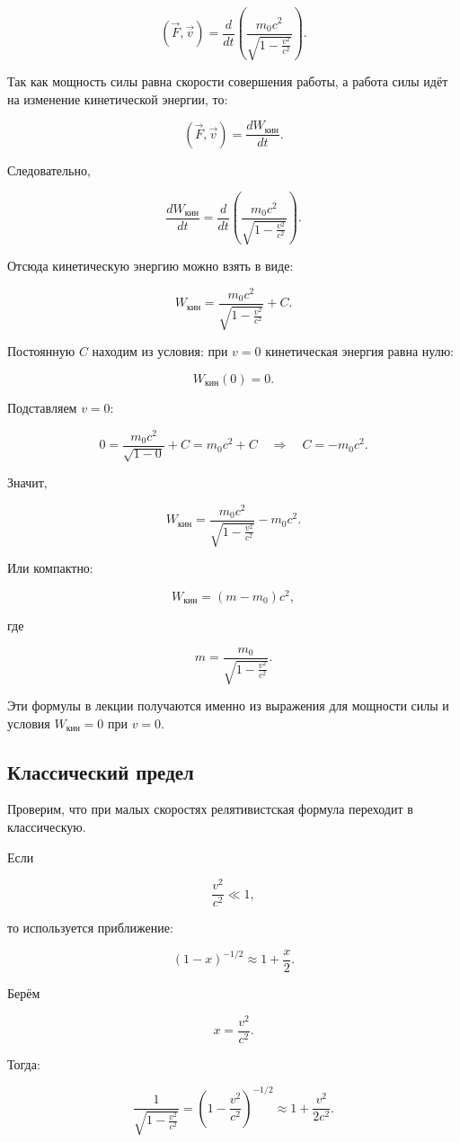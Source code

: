 \documentclass[a4paper,12pt]{article}
\begin{document}
\[
(\vec F,\vec v)
=
\frac{d}{dt}
\left(
\frac{m_0c^2}{\sqrt{1-\frac{v^2}{c^2}}}
\right).
\]

Так как мощность силы равна скорости совершения работы, а работа силы идёт на изменение кинетической энергии, то:

\[
(\vec F,\vec v)
=
\frac{dW_{\text{кин}}}{dt}.
\]

Следовательно,

\[
\frac{dW_{\text{кин}}}{dt}
=
\frac{d}{dt}
\left(
\frac{m_0c^2}{\sqrt{1-\frac{v^2}{c^2}}}
\right).
\]

Отсюда кинетическую энергию можно взять в виде:

\[
W_{\text{кин}}
=
\frac{m_0c^2}{\sqrt{1-\frac{v^2}{c^2}}}
+
C.
\]

Постоянную $C$ находим из условия: при $v=0$ кинетическая энергия равна нулю:

\[
W_{\text{кин}}(0)=0.
\]

Подставляем $v=0$:

\[
0
=
\frac{m_0c^2}{\sqrt{1-0}}
+
C
=
m_0c^2
+
C
\quad \Rightarrow \quad
C=-m_0c^2.
\]

Значит,

\[
W_{\text{кин}}
=
\frac{m_0c^2}{\sqrt{1-\frac{v^2}{c^2}}}
-
m_0c^2.
\]

Или компактно:

\[
W_{\text{кин}}
=
(m-m_0)c^2,
\]

где

\[
m=
\frac{m_0}{\sqrt{1-\frac{v^2}{c^2}}}.
\]

Эти формулы в лекции получаются именно из выражения для мощности силы и условия $W_{\text{кин}}=0$ при $v=0$.

\subsection*{Классический предел}

Проверим, что при малых скоростях релятивистская формула переходит в классическую.

Если

\[
\frac{v^2}{c^2} \ll 1,
\]

то используется приближение:

\[
(1-x)^{-1/2} \approx 1+\frac{x}{2}.
\]

Берём

\[
x=\frac{v^2}{c^2}.
\]

Тогда:

\[
\frac{1}{\sqrt{1-\frac{v^2}{c^2}}}
=
\left(1-\frac{v^2}{c^2}\right)^{-1/2}
\approx
1+\frac{v^2}{2c^2}.
\]
\end{document}
